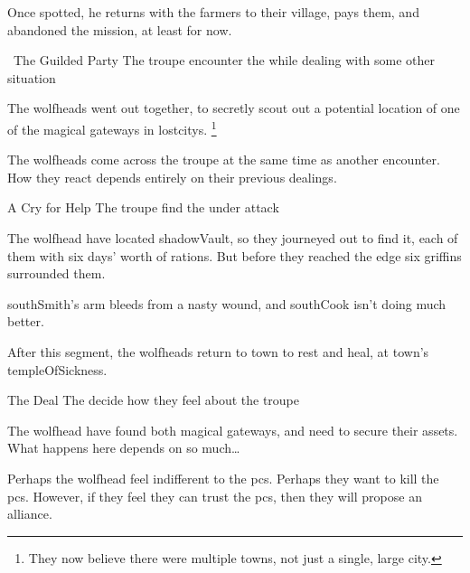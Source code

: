 Once spotted, he returns with the farmers to their \gls{village}, pays them, and abandoned the mission, at least for now.

{\squash~The Guilded Party}%
{The troupe encounter the  while dealing with some other situation}%

\begin{exampletext}
  The \glspl{wolfhead} went out together, to secretly scout out a potential location of one of the magical gateways in \glspl{lostcity}.%
  \footnote{They now believe there were multiple towns, not just a single, large city.}
\end{exampletext}

The \glspl{wolfhead} come across the troupe at the same time as another encounter.
How they react depends entirely on their previous dealings.

{A Cry for Help}%
{The troupe find the  under attack}%

The \gls{wolfhead} have located \gls{shadowVault}, so they journeyed out to find it, each of them with six days' worth of rations.
But before they reached the \gls{edge} six griffins surrounded them.


\Gls{southSmith}'s arm bleeds from a nasty wound, and \gls{southCook} isn't doing much better.

\setcounter{wounds}{3}
\southCook


After this \gls{segment}, the \glspl{wolfhead} return to \gls{town} to rest and heal, at \gls{town}'s \gls{templeOfSickness}.


{The Deal}%
{The  decide how they feel about the troupe}%

The \gls{wolfhead} have found both magical gateways, and need to secure their assets.
What happens here depends on so much\ldots

Perhaps the \gls{wolfhead} feel indifferent to the \glspl{pc}.
Perhaps they want to kill the \glspl{pc}.
However, if they feel they can trust the \glspl{pc}, then they will propose an alliance.

